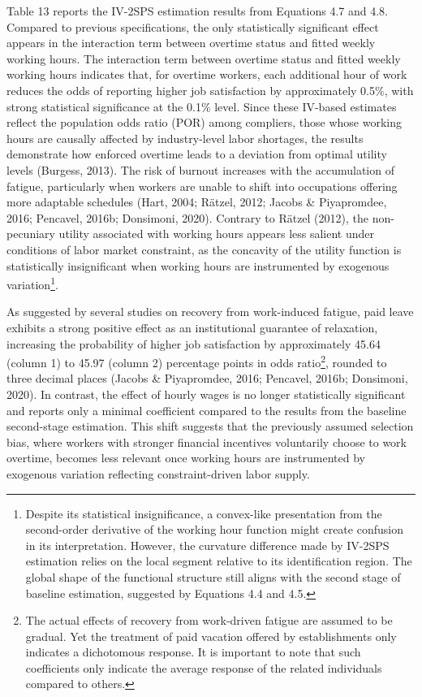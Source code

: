\documentclass[
  12pt,
]{article}
\begin{document}
Table 13 reports the IV-2SPS estimation results from Equations 4.7 and
4.8. Compared to previous specifications, the only statistically
significant effect appears in the interaction term between overtime
status and fitted weekly working hours. The interaction term between
overtime status and fitted weekly working hours indicates that, for
overtime workers, each additional hour of work reduces the odds of
reporting higher job satisfaction by approximately 0.5\%, with strong
statistical significance at the 0.1\% level. Since these IV-based
estimates reflect the population odds ratio (POR) among compliers, those
whose working hours are causally affected by industry-level labor
shortages, the results demonstrate how enforced overtime leads to a
deviation from optimal utility levels (Burgess, 2013). The risk of
burnout increases with the accumulation of fatigue, particularly when
workers are unable to shift into occupations offering more adaptable
schedules (Hart, 2004; Rätzel, 2012; Jacobs \& Piyapromdee, 2016;
Pencavel, 2016b; Donsimoni, 2020). Contrary to Rätzel (2012), the
non-pecuniary utility associated with working hours appears less salient
under conditions of labor market constraint, as the concavity of the
utility function is statistically insignificant when working hours are
instrumented by exogenous variation\footnote{Despite its statistical
  insignificance, a convex-like presentation from the second-order
  derivative of the working hour function might create confusion in its
  interpretation. However, the curvature difference made by IV-2SPS
  estimation relies on the local segment relative to its identification
  region. The global shape of the functional structure still aligns with
  the second stage of baseline estimation, suggested by Equations 4.4
  and 4.5.}.

As suggested by several studies on recovery from work-induced fatigue,
paid leave exhibits a strong positive effect as an institutional
guarantee of relaxation, increasing the probability of higher job
satisfaction by approximately 45.64 (column 1) to 45.97 (column 2)
percentage points in odds ratio\footnote{The actual effects of recovery
  from work-driven fatigue are assumed to be gradual. Yet the treatment
  of paid vacation offered by establishments only indicates a
  dichotomous response. It is important to note that such coefficients
  only indicate the average response of the related individuals compared
  to others.}, rounded to three decimal places (Jacobs \& Piyapromdee,
2016; Pencavel, 2016b; Donsimoni, 2020). In contrast, the effect of
hourly wages is no longer statistically significant and reports only a
minimal coefficient compared to the results from the baseline
second-stage estimation. This shift suggests that the previously assumed
selection bias, where workers with stronger financial incentives
voluntarily choose to work overtime, becomes less relevant once working
hours are instrumented by exogenous variation reflecting
constraint-driven labor supply.
\end{document}
